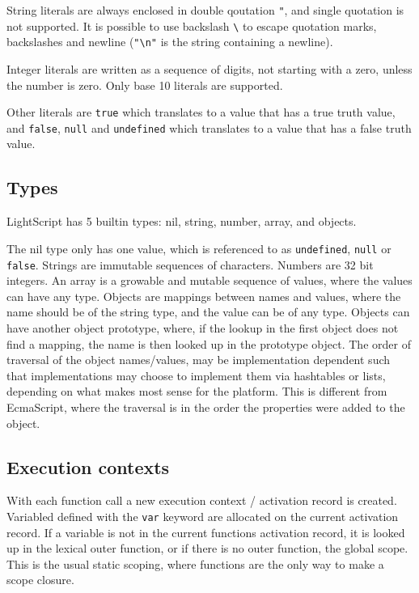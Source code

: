 \documentclass[11pt]{report}
\begin{document}
String literals are always enclosed in double qoutation \verb|"|, and single quotation is not supported. It is possible to use backslash \verb|\| to escape quotation marks, backslashes and newline (\verb|"\n"| is the string containing a newline).

Integer literals are written as a sequence of digits, not starting with a zero, unless the number is zero. Only base 10 literals are supported.

Other literals are \verb|true| which translates to a value that has a true truth value, and \verb|false|, \verb|null| and \verb|undefined| which translates to a value that has a false truth value.

\subsection{Types}
LightScript has 5 builtin types: nil, string, number, array, and objects.

The nil type only has one value, which is referenced to as \verb|undefined|, \verb|null| or \verb|false|. 
Strings are immutable sequences of characters.
Numbers are 32 bit integers.
An array is a growable and mutable sequence of values, where the values can have any type.
Objects are mappings between names and values, where the name should be of the string type, and the value can be of any type. Objects can have another object prototype, where, if the lookup in the first object does not find a mapping, the name is then looked up in the prototype object.
The order of traversal of the object names/values, may be implementation dependent such that implementations may choose to implement them via hashtables or lists, depending on what makes most sense for the platform. This is different from EcmaScript, where the traversal is in the order the properties were added to the object.

\subsection{Execution contexts}

With each function call a new execution context / activation record is created. 
Variabled defined with the \verb|var| keyword are allocated on the current activation record. 
If a variable is not in the current functions activation record,
it is looked up in the lexical outer function, or if there is no outer function, the global scope.
This is the usual static scoping, where functions are the only way to make a scope closure.
\end{document}
